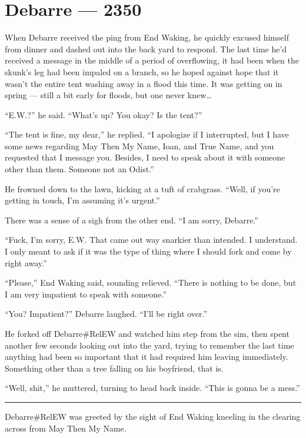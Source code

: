 \hypertarget{debarre-2350}{%
\chapter{Debarre — 2350}\label{debarre-2350}}

When Debarre received the ping from End Waking, he quickly excused himself from dinner and dashed out into the back yard to respond. The last time he'd received a message in the middle of a period of overflowing, it had been when the skunk's leg had been impaled on a branch, so he hoped against hope that it wasn't the entire tent washing away in a flood this time. It was getting on in spring — still a bit early for floods, but one never knew\ldots{}

``E.W.?'' he said. ``What's up? You okay? Is the tent?''

``The tent is fine, my dear,'' he replied. ``I apologize if I interrupted, but I have some news regarding May Then My Name, Ioan, and True Name, and you requested that I message you. Besides, I need to speak about it with someone other than them. Someone not an Odist.''

He frowned down to the lawn, kicking at a tuft of crabgrass. ``Well, if you're getting in touch, I'm assuming it's urgent.''

There was a sense of a sigh from the other end. ``I am sorry, Debarre.''

``Fuck, I'm sorry, E.W. That came out way snarkier than intended. I understand. I only meant to ask if it was the type of thing where I should fork and come by right away.''

``Please,'' End Waking said, sounding relieved. ``There is nothing to be done, but I am very impatient to speak with someone.''

``You? Impatient?'' Debarre laughed. ``I'll be right over.''

He forked off Debarre\#RelEW and watched him step from the sim, then spent another few seconds looking out into the yard, trying to remember the last time anything had been so important that it had required him leaving immediately. Something other than a tree falling on his boyfriend, that is.

``Well, shit,'' he muttered, turning to head back inside. ``This is gonna be a mess.''

\begin{center}\rule{0.5\linewidth}{0.5pt}\end{center}

Debarre\#RelEW was greeted by the sight of End Waking kneeling in the clearing across from May Then My Name.

